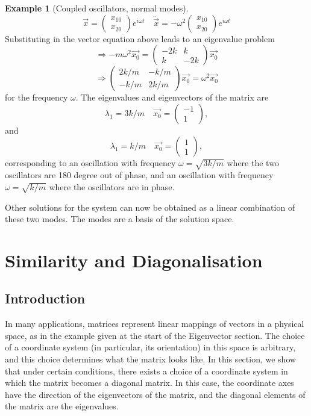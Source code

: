 \documentclass[
  a4paper,
  DIV=11,
  numbers=noendperiod,
  oneside]{scrreprt}
\theoremstyle{definition}
\newtheorem{example}{Example}[chapter]
\theoremstyle{remark}
\begin{document}
\begin{example}[Coupled oscillators, normal
modes]
\[\vec{x} = \begin{pmatrix} x_{10} \\ x_{20} \end{pmatrix} e^{i \omega t} \quad \ddot{\vec{x}} = - \omega^2 \begin{pmatrix} x_{10} \\ x_{20} \end{pmatrix} e^{i \omega t}\]
Substituting in the vector equation above leads to an eigenvalue problem
\[ \Rightarrow - m \omega^2 \vec{x_0} = \begin{pmatrix} -2 k & k \\ k & -2k  \end{pmatrix} \vec{x_0}\]
\[ \Rightarrow  \begin{pmatrix} 2 k/m & - k/m \\ - k/m & 2k/m  \end{pmatrix} \vec{x_0} = \omega^2 \vec{x_0}  \]
for the frequency \(\omega\). The eigenvalues and eigenvectors of the
matrix are\\
\[ \lambda_1 = 3 k/m \quad \vec{x_0} = \begin{pmatrix} -1\\ 1 \end{pmatrix}, \]
and
\[ \lambda_1 = k/m \quad \vec{x_0} = \begin{pmatrix} 1\\ 1 \end{pmatrix}, \]
corresponding to an oscillation with frequency \(\omega = \sqrt{3k/m}\)
where the two oscillators are 180 degree out of phase, and an
oscillation with frequency \(\omega = \sqrt{k/m}\) where the oscillators
are in phase.

Other solutions for the system can now be obtained as a linear
combination of these two modes. The modes are a basis of the solution
space.

\end{example}

\section{Similarity and
Diagonalisation}\label{similarity-and-diagonalisation}

\subsection{Introduction}\label{introduction-2}

In many applications, matrices represent linear mappings of vectors in a
physical space, as in the example given at the start of the Eigenvector
section. The choice of a coordinate system (in particular, its
orientation) in this space is arbitrary, and this choice determines what
the matrix looks like. In this section, we show that under certain
conditions, there exists a choice of a coordinate system in which the
matrix becomes a diagonal matrix. In this case, the coordinate axes have
the direction of the eigenvectors of the matrix, and the diagonal
elements of the matrix are the eigenvalues.
\end{document}
